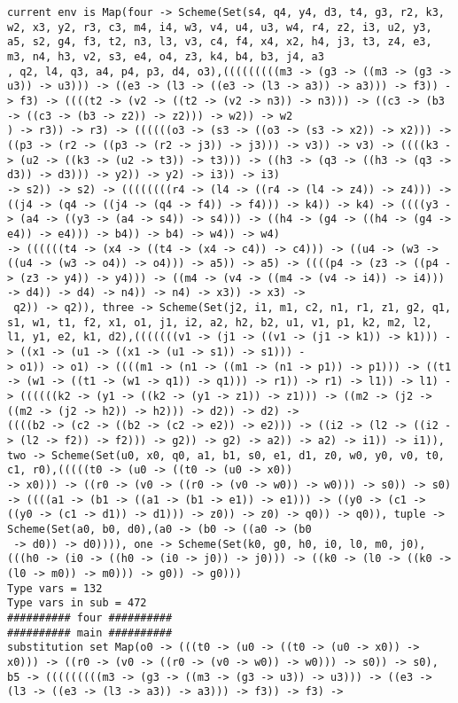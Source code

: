 \documentclass[11pt,oneside,a4paper]{report}
\begin{document}
\begin{lstlisting}[breaklines=true,caption={The output of an exponential type},label=lst:appedix:bigexp]
current env is Map(four -> Scheme(Set(s4, q4, y4, d3, t4, g3, r2, k3, w2, x3, y2, r3, c3, m4, i4, w3, v4, u4, u3, w4, r4, z2, i3, u2, y3, a5, s2, g4, f3, t2, n3, l3, v3, c4, f4, x4, x2, h4, j3, t3, z4, e3, m3, n4, h3, v2, s3, e4, o4, z3, k4, b4, b3, j4, a3
, q2, l4, q3, a4, p4, p3, d4, o3),(((((((((m3 -> (g3 -> ((m3 -> (g3 -> u3)) -> u3))) -> ((e3 -> (l3 -> ((e3 -> (l3 -> a3)) -> a3))) -> f3)) -> f3) -> ((((t2 -> (v2 -> ((t2 -> (v2 -> n3)) -> n3))) -> ((c3 -> (b3 -> ((c3 -> (b3 -> z2)) -> z2))) -> w2)) -> w2
) -> r3)) -> r3) -> ((((((o3 -> (s3 -> ((o3 -> (s3 -> x2)) -> x2))) -> ((p3 -> (r2 -> ((p3 -> (r2 -> j3)) -> j3))) -> v3)) -> v3) -> ((((k3 -> (u2 -> ((k3 -> (u2 -> t3)) -> t3))) -> ((h3 -> (q3 -> ((h3 -> (q3 -> d3)) -> d3))) -> y2)) -> y2) -> i3)) -> i3)
-> s2)) -> s2) -> ((((((((r4 -> (l4 -> ((r4 -> (l4 -> z4)) -> z4))) -> ((j4 -> (q4 -> ((j4 -> (q4 -> f4)) -> f4))) -> k4)) -> k4) -> ((((y3 -> (a4 -> ((y3 -> (a4 -> s4)) -> s4))) -> ((h4 -> (g4 -> ((h4 -> (g4 -> e4)) -> e4))) -> b4)) -> b4) -> w4)) -> w4)
-> ((((((t4 -> (x4 -> ((t4 -> (x4 -> c4)) -> c4))) -> ((u4 -> (w3 -> ((u4 -> (w3 -> o4)) -> o4))) -> a5)) -> a5) -> ((((p4 -> (z3 -> ((p4 -> (z3 -> y4)) -> y4))) -> ((m4 -> (v4 -> ((m4 -> (v4 -> i4)) -> i4))) -> d4)) -> d4) -> n4)) -> n4) -> x3)) -> x3) ->
 q2)) -> q2)), three -> Scheme(Set(j2, i1, m1, c2, n1, r1, z1, g2, q1, s1, w1, t1, f2, x1, o1, j1, i2, a2, h2, b2, u1, v1, p1, k2, m2, l2, l1, y1, e2, k1, d2),(((((((v1 -> (j1 -> ((v1 -> (j1 -> k1)) -> k1))) -> ((x1 -> (u1 -> ((x1 -> (u1 -> s1)) -> s1))) -
> o1)) -> o1) -> ((((m1 -> (n1 -> ((m1 -> (n1 -> p1)) -> p1))) -> ((t1 -> (w1 -> ((t1 -> (w1 -> q1)) -> q1))) -> r1)) -> r1) -> l1)) -> l1) -> ((((((k2 -> (y1 -> ((k2 -> (y1 -> z1)) -> z1))) -> ((m2 -> (j2 -> ((m2 -> (j2 -> h2)) -> h2))) -> d2)) -> d2) ->
((((b2 -> (c2 -> ((b2 -> (c2 -> e2)) -> e2))) -> ((i2 -> (l2 -> ((i2 -> (l2 -> f2)) -> f2))) -> g2)) -> g2) -> a2)) -> a2) -> i1)) -> i1)), two -> Scheme(Set(u0, x0, q0, a1, b1, s0, e1, d1, z0, w0, y0, v0, t0, c1, r0),(((((t0 -> (u0 -> ((t0 -> (u0 -> x0))
-> x0))) -> ((r0 -> (v0 -> ((r0 -> (v0 -> w0)) -> w0))) -> s0)) -> s0) -> ((((a1 -> (b1 -> ((a1 -> (b1 -> e1)) -> e1))) -> ((y0 -> (c1 -> ((y0 -> (c1 -> d1)) -> d1))) -> z0)) -> z0) -> q0)) -> q0)), tuple -> Scheme(Set(a0, b0, d0),(a0 -> (b0 -> ((a0 -> (b0
 -> d0)) -> d0)))), one -> Scheme(Set(k0, g0, h0, i0, l0, m0, j0),(((h0 -> (i0 -> ((h0 -> (i0 -> j0)) -> j0))) -> ((k0 -> (l0 -> ((k0 -> (l0 -> m0)) -> m0))) -> g0)) -> g0)))
Type vars = 132
Type vars in sub = 472
########## four ##########
########## main ##########
substitution set Map(o0 -> (((t0 -> (u0 -> ((t0 -> (u0 -> x0)) -> x0))) -> ((r0 -> (v0 -> ((r0 -> (v0 -> w0)) -> w0))) -> s0)) -> s0), b5 -> (((((((((m3 -> (g3 -> ((m3 -> (g3 -> u3)) -> u3))) -> ((e3 -> (l3 -> ((e3 -> (l3 -> a3)) -> a3))) -> f3)) -> f3) ->

\end{lstlisting}
\end{document}
